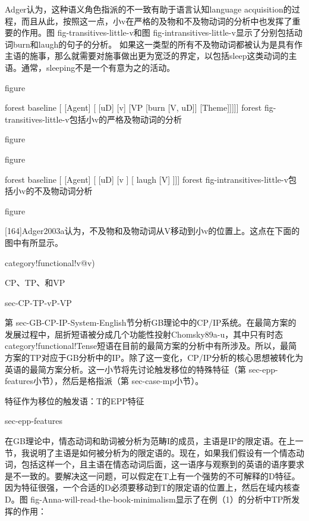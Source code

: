 Adger认为，这种语义角色指派的不一致有助于语言认知language acquisition的过程，而且从此，按照这一点，小v在严格的及物和不及物动词的分析中也发挥了重要的作用。图 fig-transitives-little-v和图 fig-intransitives-little-v显示了分别包括动词burn和laugh的句子的分析。 
如果这一类型的所有不及物动词都被认为是具有作主语的施事，那么就需要对施事做出更为宽泛的界定，以包括sleep这类动词的主语。通常，sleeping不是一个有意为之的活动。










figure

forest
baseline
[
  [Agent]
  [ [uD]
   [v]
   [VP
      [burn [V, uD]]
      [Theme]]]]]
forest
fig-transitives-little-v包括小v的严格及物动词的分析

figure

figure

forest
baseline
[
  [Agent]
  [ [uD]
   [v ]
   [ laugh [V] ]]]
forest
fig-intransitives-little-v包括小v的不及物动词分析

figure

[164]Adger2003a认为，不及物和及物动词从V移动到小v的位置上。这点在下面的图中有所显示。


category!functional!v@v)

CP、TP、和VP

sec-CP-TP-vP-VP

第 sec-GB-CP-IP-System-English节分析GB理论中的CP/IP系统。在最简方案的发展过程中，屈折短语被分成几个功能性投射Chomsky89a-u，其中只有时态category!functional!Tense短语在目前的最简方案的分析中有所涉及。所以，最简方案的TP对应于GB分析中的IP。除了这一变化，CP/IP分析的核心思想被转化为英语的最简方案分析。这一小节将先讨论触发移位的特殊特征（第 sec-epp-features小节），然后是格指派（第 sec-case-mp小节）。













特征作为移位的触发语：T的EPP特征

sec-epp-features

在GB理论中，情态动词和助词被分析为范畴I的成员，主语是IP的限定语。在上一节，我说明了主语是如何被分析为的限定语的。现在，如果我们假设有一个情态动词，包括这样一个，且主语在情态动词后面，这一语序与观察到的英语的语序要求是不一致的。要解决这一问题，可以假定在T上有一个强势的不可解释的D特征。因为特征很强，一个合适的D必须要移动到T的限定语的位置上，然后在域内核查D。图 fig-Anna-will-read-the-book-minimalism显示了在例（1）的分析中TP所发挥的作用：









